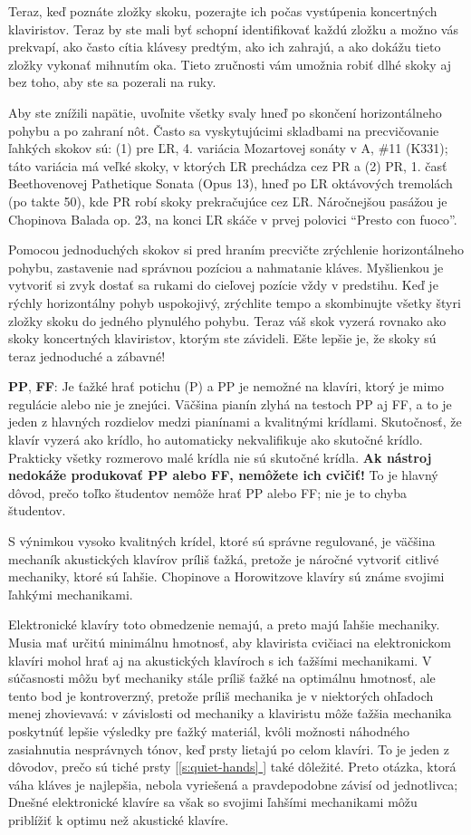\documentclass[11pt,a4paper]{book}
\newcommand*{\fullref}[1]{\hyperref[{#1}]{\ref*{#1} \nameref*{#1}}} %
\newcommand*{\fullrefp}[1]{[\fullref{#1}]} %
\begin{document}
Teraz, keď poznáte zložky skoku, pozerajte ich počas vystúpenia koncertných klaviristov. Teraz by ste mali byť schopní identifikovať každú zložku a možno vás prekvapí, ako často cítia klávesy predtým, ako ich zahrajú, a ako dokážu tieto zložky vykonať mihnutím oka. Tieto zručnosti vám umožnia robiť dlhé skoky aj bez toho, aby ste sa pozerali na ruky.

Aby ste znížili napätie, uvoľnite všetky svaly hneď po skončení horizontálneho pohybu a po zahraní nôt. Často sa vyskytujúcimi skladbami na precvičovanie ľahkých skokov sú: (1) pre ĽR, 4. variácia Mozartovej sonáty v A, \#11 (K331); táto variácia má veľké skoky, v ktorých ĽR prechádza cez PR a (2) PR, 1. časť Beethovenovej Pathetique Sonata (Opus 13), hneď po ĽR oktávových tremolách (po takte 50), kde PR robí skoky prekračujúce cez ĽR. Náročnejšou pasážou je Chopinova Balada op. 23, na konci ĽR skáče v prvej polovici “Presto con fuoco”.

Pomocou jednoduchých skokov si pred hraním precvičte zrýchlenie horizontálneho pohybu, zastavenie nad správnou pozíciou a nahmatanie kláves. Myšlienkou je vytvoriť si zvyk dostať sa rukami do cieľovej pozície vždy v predstihu. Keď je rýchly horizontálny pohyb uspokojivý, zrýchlite tempo a skombinujte všetky štyri zložky skoku do jedného plynulého pohybu. Teraz váš skok vyzerá rovnako ako skoky koncertných klaviristov, ktorým ste závideli. Ešte lepšie je, že skoky sú teraz jednoduché a zábavné!

\textbf{PP}, \textbf{FF}: Je ťažké hrať potichu (P) a PP je nemožné na klavíri, ktorý je mimo regulácie alebo nie je znejúci. Väčšina pianín zlyhá na testoch PP aj FF, a to je jeden z hlavných rozdielov medzi pianínami a kvalitnými krídlami. Skutočnosť, že klavír vyzerá ako krídlo, ho automaticky nekvalifikuje ako skutočné krídlo. Prakticky všetky rozmerovo malé krídla nie sú skutočné krídla. \textbf{Ak nástroj nedokáže produkovať PP alebo FF, nemôžete ich cvičiť!} To je hlavný dôvod, prečo toľko študentov nemôže hrať PP alebo FF; nie je to chyba študentov.

S výnimkou vysoko kvalitných krídel, ktoré sú správne regulované, je väčšina mechaník  akustických klavírov príliš ťažká, pretože je náročné vytvoriť citlivé mechaniky, ktoré sú ľahšie. Chopinove a Horowitzove klavíry sú známe svojimi ľahkými mechanikami.

Elektronické klavíry toto obmedzenie nemajú, a preto majú ľahšie mechaniky. Musia mať určitú minimálnu hmotnosť, aby klavirista cvičiaci na elektronickom klavíri mohol hrať aj na akustických klavíroch s ich ťažšími mechanikami. V súčasnosti môžu byť mechaniky stále príliš ťažké na optimálnu hmotnosť, ale tento bod je kontroverzný, pretože príliš mechanika je v niektorých ohľadoch menej zhovievavá: v závislosti od mechaniky a klaviristu môže ťažšia mechanika poskytnúť lepšie výsledky pre ťažký materiál, kvôli možnosti náhodného zasiahnutia nesprávnych tónov, keď prsty lietajú po celom klavíri. To je jeden z dôvodov, prečo sú tiché prsty \fullrefp{s:quiet-hands} také dôležité. Preto otázka, ktorá váha kláves je najlepšia, nebola vyriešená a pravdepodobne závisí od jednotlivca; Dnešné elektronické klavíre sa však so svojimi ľahšími mechanikami môžu priblížiť k optimu než akustické klavíre.
\end{document}
